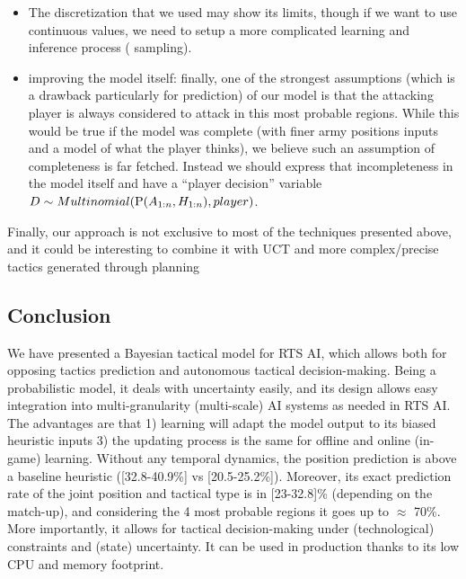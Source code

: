 \begin{itemize}
    \item The discretization that we used may show its limits, though if we want to use continuous values, we need to setup a more complicated learning and inference process ( sampling).
    \item improving the model itself: finally, one of the strongest assumptions (which is a drawback particularly for prediction) of our model is that the attacking player is always considered to attack in this most probable regions. While this would be true if the model was complete (with finer army positions inputs and a model of what the player thinks), we believe such an assumption of completeness is far fetched. Instead we should express that incompleteness in the model itself and have a ``player decision'' variable $D \sim Multinomial(\mathrm{P}(A_{1:n},H_{1:n}),player)$.
\end{itemize} 

Finally, our approach is not exclusive to most of the techniques presented above, and it could be interesting to combine it with UCT \citep{UCT} and more complex/precise tactics generated through planning \citep{Chung05}

\subsection{Conclusion}


We have presented a Bayesian tactical model for RTS AI, which allows both for opposing tactics prediction and autonomous tactical decision-making. Being a probabilistic model, it deals with uncertainty easily, and its design allows easy integration into multi-granularity (multi-scale) AI systems as needed in RTS AI. The advantages are that 1) learning will adapt the model output to its biased heuristic inputs %
3) the updating process is the same for offline and online (in-game) learning. 
Without any temporal dynamics, the position prediction is above a baseline heuristic ([32.8-40.9\%] vs [20.5-25.2\%]). Moreover, its exact prediction rate of the joint position and tactical type is in [23-32.8]\% (depending on the match-up), and considering the 4 most probable regions it goes up to $\approx$ 70\%. More importantly, it allows for tactical decision-making under (technological) constraints and (state) uncertainty. It can be used in production thanks to its low CPU and memory footprint. %

